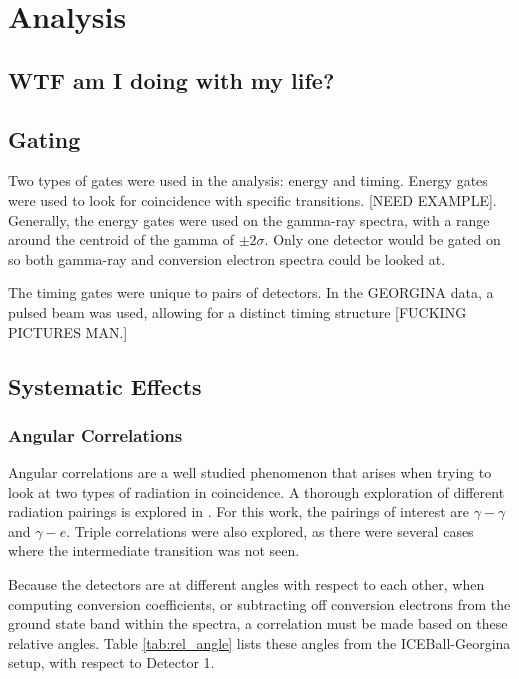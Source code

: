 \chapter{Analysis}

\section{WTF am I doing with my life?}

\section{Gating}

Two types of gates were used in the analysis: energy and timing. Energy gates were used to look for coincidence with specific transitions. [NEED EXAMPLE]. Generally, the energy gates were used on the gamma-ray spectra, with a range around the centroid of the gamma of $\pm2\sigma$. Only one detector would be gated on so both gamma-ray and conversion electron spectra could be looked at.

The timing gates were unique to pairs of detectors. In the GEORGINA data, a pulsed beam was used, allowing for a distinct timing structure [FUCKING PICTURES MAN.]

\section{Systematic Effects}

\subsection{Angular Correlations}

Angular correlations are a well studied phenomenon that arises when trying to look at two types of radiation in coincidence. A thorough exploration of different radiation pairings is explored in \citep{biedenharn53:_theory_angular_corr}. For this work, the pairings of interest are $\gamma-\gamma$ and $\gamma-e$. Triple correlations were also explored, as there were several cases where the intermediate transition was not seen.

Because the detectors are at different angles with respect to each other, when computing conversion coefficients, or subtracting off conversion electrons from the ground state band within the spectra, a correlation must be made based on these relative angles. Table \ref{tab:rel_angle} lists these angles from the ICEBall-Georgina setup, with respect to Detector 1.

